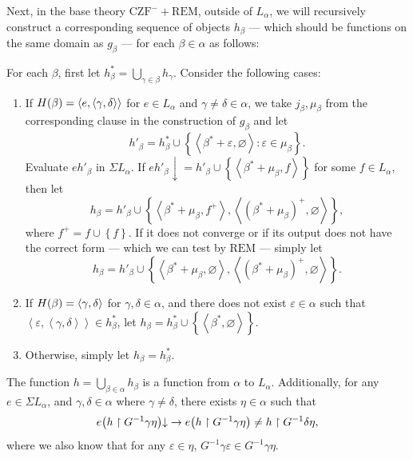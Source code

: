 \documentclass[12pt,openany]{book}
\theoremstyle{plain}
\theoremstyle{definition}
\newcommand\uplabel[1]{\textup{(#1)}}
\newcommand\tuple[1]{\left\langle #1 \right\rangle}
\newcommand\CZF{\mathrm{CZF}}
\newcommand\REM{\mathrm{REM}}
\begin{document}
Next, in the base theory $\CZF^- + \REM$, outside of $L_\alpha$, we will recursively construct a corresponding sequence of objects $h_\beta$ --- which should be functions on the same domain as $g_\beta$ --- for each $\beta \in \alpha$ as follows:

For each $\beta$, first let $h^*_\beta = \bigcup_{\gamma \in \beta} h_\gamma$. Consider the following cases:
\begin{enumerate}[label=\uplabel{\roman*}]
  \item \label{itm:alpha-rec-incom-ind-case-wit} If $H\mleft(\beta\mright) = \tuple{e, \tuple{\gamma, \delta}}$ for $e \in L_\alpha$ and $\gamma \neq \delta \in \alpha$, we take $j_\beta, \mu_\beta$ from the corresponding clause in the construction of $g_\beta$ and let
        \[h'_\beta = h^*_\beta \cup \left\{\tuple{\beta^* + \varepsilon, \varnothing} : \varepsilon \in \mu_\beta\right\}.\]
        Evaluate $e h'_\beta$ in $\Sigma L_\alpha$. If $e h'_\beta {\downarrow} = h'_\beta \cup \left\{\tuple{\beta^* + \mu_\beta, f}\right\}$ for some $f \in L_\alpha$, then let
        \[h_\beta = h'_\beta \cup \left\{\tuple{\beta^* + \mu_\beta, f^+}, \tuple{\left(\beta^* + \mu_\beta\right)^+, \varnothing}\right\},\]
        where $f^+ = f \cup \left\{f\right\}$. If it does not converge or if its output does not have the correct form --- which we can test by $\REM$ --- simply let
        \[h_\beta = h'_\beta \cup \left\{\tuple{\beta^* + \mu_\beta, \varnothing}, \tuple{\left(\beta^* + \mu_\beta\right)^+, \varnothing}\right\}.\]
  \item If $H\mleft(\beta\mright) = \tuple{\gamma, \delta}$ for $\gamma, \delta \in \alpha$, and there does not exist $\varepsilon \in \alpha$ such that $\tuple{\varepsilon, \tuple{\gamma, \delta}} \in h^*_\beta$, let $h_\beta = h^*_\beta \cup \left\{\tuple{\beta^*, \varnothing}\right\}$.
  \item Otherwise, simply let $h_\beta = h^*_\beta$.
\end{enumerate}

\begin{lemma}
  \label{lem:alpha-rec-non-comp-path}
  The function $h = \bigcup_{\beta \in \alpha} h_\beta$ is a function from $\alpha$ to $L_\alpha$. Additionally, for any $e \in \Sigma L_\alpha$, and $\gamma, \delta \in \alpha$ where $\gamma \neq \delta$, there exists $\eta \in \alpha$ such that
  \[e \mleft(h \upharpoonright G^{-1} \gamma \eta\mright) {\downarrow} \rightarrow e \mleft(h \upharpoonright G^{-1} \gamma \eta\mright) \neq h \upharpoonright G^{-1} \delta \eta,\]
  where we also know that for any $\varepsilon \in \eta$, $G^{-1} \gamma \varepsilon \in G^{-1} \gamma \eta$.
\end{lemma}
\end{document}
